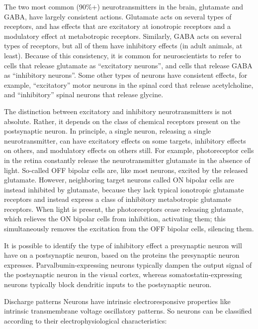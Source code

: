 \documentclass[]{book}
\begin{document}
The two most common (90\%+) neurotransmitters in the brain, glutamate and GABA, have largely consistent actions. Glutamate acts on several types of receptors, and has effects that are excitatory at ionotropic receptors and a modulatory effect at metabotropic receptors. Similarly, GABA acts on several types of receptors, but all of them have inhibitory effects (in adult animals, at least). Because of this consistency, it is common for neuroscientists to refer to cells that release glutamate as ``excitatory neurons'', and cells that release GABA as ``inhibitory neurons''. Some other types of neurons have consistent effects, for example, ``excitatory'' motor neurons in the spinal cord that release acetylcholine, and ``inhibitory'' spinal neurons that release glycine.

The distinction between excitatory and inhibitory neurotransmitters is not absolute. Rather, it depends on the class of chemical receptors present on the postsynaptic neuron. In principle, a single neuron, releasing a single neurotransmitter, can have excitatory effects on some targets, inhibitory effects on others, and modulatory effects on others still. For example, photoreceptor cells in the retina constantly release the neurotransmitter glutamate in the absence of light. So-called OFF bipolar cells are, like most neurons, excited by the released glutamate. However, neighboring target neurons called ON bipolar cells are instead inhibited by glutamate, because they lack typical ionotropic glutamate receptors and instead express a class of inhibitory metabotropic glutamate receptors. When light is present, the photoreceptors cease releasing glutamate, which relieves the ON bipolar cells from inhibition, activating them; this simultaneously removes the excitation from the OFF bipolar cells, silencing them.

It is possible to identify the type of inhibitory effect a presynaptic neuron will have on a postsynaptic neuron, based on the proteins the presynaptic neuron expresses. Parvalbumin-expressing neurons typically dampen the output signal of the postsynaptic neuron in the visual cortex, whereas somatostatin-expressing neurons typically block dendritic inputs to the postsynaptic neuron.

Discharge patterns
Neurons have intrinsic electroresponsive properties like intrinsic transmembrane voltage oscillatory patterns. So neurons can be classified according to their electrophysiological characteristics:
\end{document}
